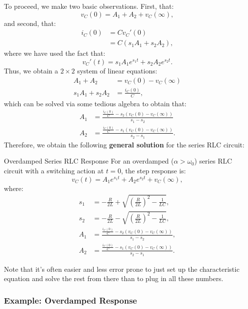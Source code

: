 \documentclass[twoside]{article}
\begin{document}
To proceed, we make two basic observations. First, that:
\[
    v_{C}(0) = A_{1} + A_{2} + v_{C}(\infty),
\]
and second, that:
\begin{align*}
    i_{C}(0) &= C v_{C}'(0) \\
             &= C \left(s_{1}A_{1} + s_{2}A_{2}\right),
\end{align*}
where we have used the fact that:
\[
    v_{C}'(t) = s_{1}A_{1}e^{s_{1}t} + s_{2}A_{2}e^{s_{2}t}.
\]
Thus, we obtain a $2 \times 2$ system of linear equations:
\begin{align*}
    A_{1} + A_{2} &= v_{C}(0) - v_{C}(\infty) \\
    s_{1}A_{1} + s_{2}A_{2} &= \frac{i_{C}(0)}{C},
\end{align*}
which can be solved via some tedious algebra to obtain that:
\begin{align*}
    A_{1} &= \frac{\frac{i_{C}(0)}{C} - s_{2}\left(v_{C}(0) - v_{C}(\infty)\right)}{s_{1} - s_{2}} \\
    A_{2} &= \frac{\frac{i_{C}(0)}{C} - s_{1}\left(v_{C}(0) - v_{C}(\infty)\right)}{s_{2} - s_{1}}.
\end{align*}
Therefore, we obtain the following \textbf{general solution} for the series RLC circuit: \\
\begin{cyanbox}{Overdamped Series RLC Response}
    For an overdamped ($\alpha > \omega_{0}$) series RLC circuit with a switching action at $t = 0$, the step response is:
    \[
        v_{C}(t) = A_{1}e^{s_{1}t} + A_{2}e^{s_{2}t} + v_{C}(\infty),
    \]
    where:
    \begin{align*}
    s_{1} &= -\frac{R}{2L} + \sqrt{\left(\frac{R}{2L}\right)^{2} - \frac{1}{LC}}, \\
    s_{2} &= -\frac{R}{2L} - \sqrt{\left(\frac{R}{2L}\right)^{2} - \frac{1}{LC}}, \\
    A_{1} &= \frac{\frac{i_{C}(0)}{C} - s_{2}\left(v_{C}(0) - v_{C}(\infty)\right)}{s_{1} - s_{2}}, \\
    A_{2} &= \frac{\frac{i_{C}(0)}{C} - s_{1}\left(v_{C}(0) - v_{C}(\infty)\right)}{s_{2} - s_{1}}.
    \end{align*}
\end{cyanbox}
Note that it's often easier and less error prone to just set up the characteristic equation and solve the rest from there than to plug in all these numbers.

\subsubsection{Example: Overdamped Response}
\end{document}
